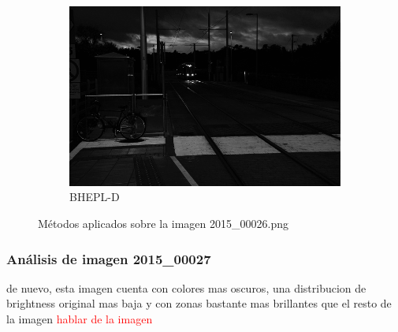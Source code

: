 \documentclass[sigchi]{acmart}
\newcommand{\rojo}[1]{\textcolor{red}{#1}}
\begin{document}
\begin{figure}[htbp]
	\begin{subfigure}[b]{0.32\textwidth}
		\centering
		\includegraphics[width=\linewidth]{./procesadas/2015_00026/2015_00026_bhepl_d.png}
		\caption{BHEPL-D}
	\end{subfigure}

	\caption{Métodos aplicados sobre la imagen 2015\_00026.png}
	\label{fig:visual_026}
\end{figure}


\subsubsection{Análisis de imagen 2015\_00027}

de nuevo, esta imagen cuenta con colores mas oscuros, una distribucion de brightness original mas baja y
con zonas bastante mas brillantes que el resto de la imagen
\rojo{hablar de la imagen}
\end{document}
